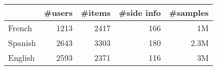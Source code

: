 \begin{tabular}{lrrrr}
\toprule
{} &  \#users &  \#items & \#side info & \#samples \\
\midrule
French  &    1213 &  2417    &  166 &   1M  \\
Spanish  &    2643 &  3303    &  180 &   2.3M  \\
English  &    2593 &  2371    &  116 &   3M  \\
\bottomrule
\end{tabular}
